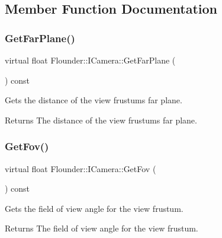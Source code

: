 \subsection{Member Function Documentation}
\mbox{\label{class_flounder_1_1_i_camera_ad21b097da1c612a48ea6f98f31ed93cf}} 
\subsubsection{\texorpdfstring{Get\+Far\+Plane()}{GetFarPlane()}}
{\footnotesize\ttfamily virtual float Flounder\+::\+I\+Camera\+::\+Get\+Far\+Plane (\begin{DoxyParamCaption}{ }\end{DoxyParamCaption}) const\hspace{0.3cm}{\ttfamily [pure virtual]}}



Gets the distance of the view frustum\textquotesingle{}s far plane. 

\begin{DoxyReturn}{Returns}
The distance of the view frustum\textquotesingle{}s far plane. 
\end{DoxyReturn}
\mbox{\label{class_flounder_1_1_i_camera_ae3e6d8f9745ee494b15b3901fba9dd88}} 
\subsubsection{\texorpdfstring{Get\+Fov()}{GetFov()}}
{\footnotesize\ttfamily virtual float Flounder\+::\+I\+Camera\+::\+Get\+Fov (\begin{DoxyParamCaption}{ }\end{DoxyParamCaption}) const\hspace{0.3cm}{\ttfamily [pure virtual]}}



Gets the field of view angle for the view frustum. 

\begin{DoxyReturn}{Returns}
The field of view angle for the view frustum. 
\end{DoxyReturn}
\mbox{\label{class_flounder_1_1_i_camera_ac8790126026e7c4cd6e285627d2c5ba8}} 
